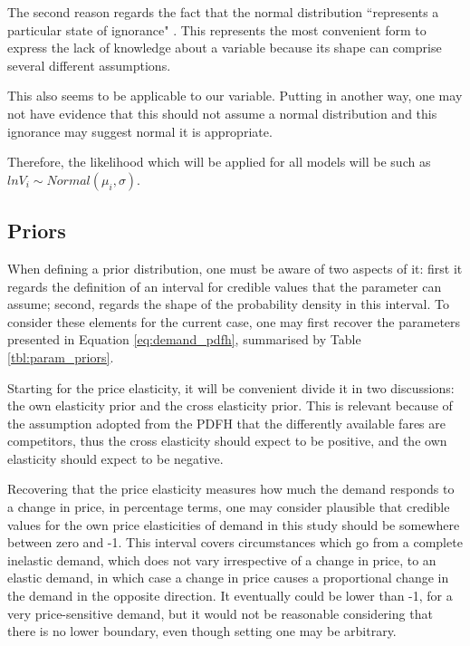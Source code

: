 The second reason regards the fact that the normal distribution ``represents a particular state of ignorance" \citep[p.~75]{mcelreath2012}. This represents the most convenient form to express the lack of knowledge about a variable because its shape can comprise several different assumptions.

This also seems to be applicable to our variable. Putting in another way, one may not have evidence that this should not assume a normal distribution and this ignorance may suggest normal it is appropriate.

Therefore, the likelihood which will be applied for all models will be such as $ln V_i \sim Normal(\mu_i, \sigma)$.

\subsection{Priors} 

When defining a prior distribution, one must be aware of two aspects of it: first it regards the definition of an interval for credible values that the parameter can assume; second, regards the shape of the probability density in this interval. To consider these elements for the current case, one may first recover the parameters presented in Equation \ref{eq:demand_pdfh}, summarised by Table \ref{tbl:param_priors}.



Starting for the price elasticity, it will be convenient divide it in two discussions: the own elasticity prior and the cross elasticity prior. This is relevant because of the assumption adopted from the PDFH that the differently available fares are competitors, thus the cross elasticity should expect to be positive, and the own elasticity should expect to be negative. 

Recovering that the price elasticity measures how much the demand responds to a change in price, in percentage terms, one may consider plausible that credible values for the own price elasticities of demand in this study should be somewhere between zero and -1. This interval covers circumstances which go from a complete inelastic demand, which does not vary irrespective of a change in price, to an elastic demand, in which case a change in price causes a proportional change in the demand in the opposite direction. It eventually could be lower than -1, for a very price-sensitive demand, but it would not be reasonable considering that there is no lower boundary, even though setting one may be arbitrary.

